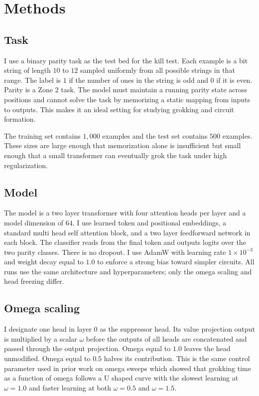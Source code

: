\section{Methods}

\subsection{Task}

I use a binary parity task as the test bed for the kill test. Each example is a bit string of length $10$ to $12$ sampled uniformly from all possible strings in that range. The label is $1$ if the number of ones in the string is odd and $0$ if it is even. Parity is a Zone 2 task. The model must maintain a running parity state across positions and cannot solve the task by memorizing a static mapping from inputs to outputs. This makes it an ideal setting for studying grokking and circuit formation.

The training set contains $1{,}000$ examples and the test set contains $500$ examples. These sizes are large enough that memorization alone is insufficient but small enough that a small transformer can eventually grok the task under high regularization.

\subsection{Model}

The model is a two layer transformer with four attention heads per layer and a model dimension of $64$. I use learned token and positional embeddings, a standard multi head self attention block, and a two layer feedforward network in each block. The classifier reads from the final token and outputs logits over the two parity classes. There is no dropout. I use AdamW with learning rate $1\times 10^{-3}$ and weight decay equal to $1.0$ to enforce a strong bias toward simpler circuits. All runs use the same architecture and hyperparameters; only the omega scaling and head freezing differ.

\subsection{Omega scaling}

I designate one head in layer 0 as the suppressor head. Its value projection output is multiplied by a scalar $\omega$ before the outputs of all heads are concatenated and passed through the output projection. Omega equal to $1.0$ leaves the head unmodified. Omega equal to $0.5$ halves its contribution. This is the same control parameter used in prior work on omega sweeps which showed that grokking time as a function of omega follows a U shaped curve with the slowest learning at $\omega = 1.0$ and faster learning at both $\omega = 0.5$ and $\omega = 1.5$.

